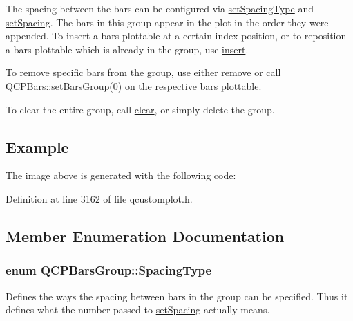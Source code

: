 The spacing between the bars can be configured via \hyperlink{class_q_c_p_bars_group_a2c7e2d61b10594a4555b615e1fcaf49e}{set\+Spacing\+Type} and \hyperlink{class_q_c_p_bars_group_aa553d327479d72a0c3dafcc724a190e2}{set\+Spacing}. The bars in this group appear in the plot in the order they were appended. To insert a bars plottable at a certain index position, or to reposition a bars plottable which is already in the group, use \hyperlink{class_q_c_p_bars_group_a309a5f7233db189f3ea9c2d04ece6c13}{insert}.

To remove specific bars from the group, use either \hyperlink{class_q_c_p_bars_group_a215e28a5944f1159013a0e19169220e7}{remove} or call \hyperlink{class_q_c_p_bars_aedd1709061f0b307c47ddb45e172ef9a}{Q\+C\+P\+Bars\+:\+:set\+Bars\+Group(0)} on the respective bars plottable.

To clear the entire group, call \hyperlink{class_q_c_p_bars_group_a3ddf23928c6cd89530bd34ab7ba7b177}{clear}, or simply delete the group.\hypertarget{class_q_c_p_bars_group_qcpbarsgroup-example}{}\subsection{Example}\label{class_q_c_p_bars_group_qcpbarsgroup-example}
The image above is generated with the following code\+: 
\begin{DoxyCodeInclude}
\end{DoxyCodeInclude}


Definition at line 3162 of file qcustomplot.\+h.



\subsection{Member Enumeration Documentation}
\hypertarget{class_q_c_p_bars_group_a4c0521120a97e60bbca37677a37075b6}{}
\subsubsection[{Spacing\+Type}]{\setlength{\rightskip}{0pt plus 5cm}enum {\bf Q\+C\+P\+Bars\+Group\+::\+Spacing\+Type}}\label{class_q_c_p_bars_group_a4c0521120a97e60bbca37677a37075b6}
Defines the ways the spacing between bars in the group can be specified. Thus it defines what the number passed to \hyperlink{class_q_c_p_bars_group_aa553d327479d72a0c3dafcc724a190e2}{set\+Spacing} actually means.

